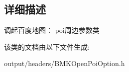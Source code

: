 \subsection{详细描述}
调起百度地图： poi周边参数类 

该类的文档由以下文件生成\+:\begin{DoxyCompactItemize}
\item 
output/headers/B\+M\+K\+Open\+Poi\+Option.\+h\end{DoxyCompactItemize}
